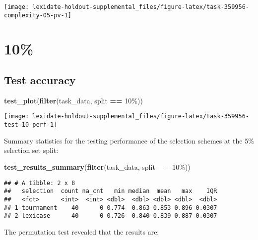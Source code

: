 \documentclass[
]{book}
\newenvironment{Shaded}{\begin{snugshade}}{\end{snugshade}}
\newcommand{\FunctionTok}[1]{\textcolor[rgb]{0.13,0.29,0.53}{\textbf{#1}}}
\newcommand{\NormalTok}[1]{#1}
\newcommand{\SpecialCharTok}[1]{\textcolor[rgb]{0.81,0.36,0.00}{\textbf{#1}}}
\newcommand{\StringTok}[1]{\textcolor[rgb]{0.31,0.60,0.02}{#1}}
\begin{document}
\texttt{[image: lexidate-holdout-supplemental\_files/figure-latex/task-359956-complexity-05-pv-1]}

\hypertarget{section-26}{%
\section{10\%}\label{section-26}}

\hypertarget{test-accuracy-26}{%
\subsection{Test accuracy}\label{test-accuracy-26}}

\begin{Shaded}
\begin{Highlighting}[]
\FunctionTok{test\_plot}\NormalTok{(}\FunctionTok{filter}\NormalTok{(task\_data, split }\SpecialCharTok{==} \StringTok{\textquotesingle{}10\%\textquotesingle{}}\NormalTok{))}
\end{Highlighting}
\end{Shaded}

\texttt{[image: lexidate-holdout-supplemental\_files/figure-latex/task-359956-test-10-perf-1]}

Summary statistics for the testing performance of the selection schemes at the 5\% selection set split:

\begin{Shaded}
\begin{Highlighting}[]
\FunctionTok{test\_results\_summary}\NormalTok{(}\FunctionTok{filter}\NormalTok{(task\_data, split }\SpecialCharTok{==} \StringTok{\textquotesingle{}10\%\textquotesingle{}}\NormalTok{))}
\end{Highlighting}
\end{Shaded}

\begin{verbatim}
## # A tibble: 2 x 8
##   selection  count na_cnt   min median  mean   max    IQR
##   <fct>      <int>  <int> <dbl>  <dbl> <dbl> <dbl>  <dbl>
## 1 tournament    40      0 0.774  0.863 0.853 0.896 0.0307
## 2 lexicase      40      0 0.726  0.840 0.839 0.887 0.0307
\end{verbatim}

The permutation test revealed that the results are:
\end{document}

